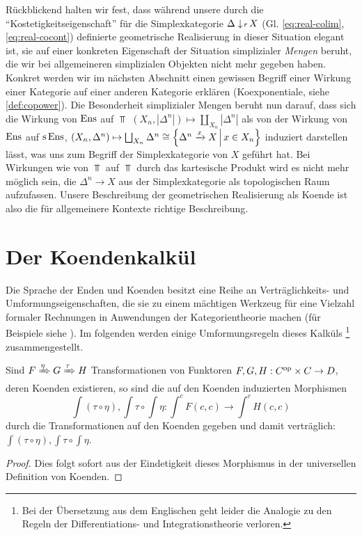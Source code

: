 \begin{bem} \label{coend-correct-real}
  Rückblickend halten wir fest, dass während unsere durch die
  ``Kostetigkeitseigenschaft'' für die Simplexkategorie
  $\Delta \downarrow \! {\scriptstyle r} \, X$ (Gl. \ref{eq:real-colim},
  \ref{eq:real-cocont}) definierte geometrische Realisierung in dieser
  Situation elegant ist, sie auf einer konkreten Eigenschaft der
  Situation simplizialer \emph{Mengen} beruht, die wir bei
  allgemeineren simplizialen Objekten nicht mehr gegeben
  haben. Konkret werden wir im nächsten Abschnitt einen gewissen
  Begriff einer Wirkung einer Kategorie auf einer anderen Kategorie
  erklären (Koexponentiale, siehe \ref{def:copower}). Die Besonderheit
  simplizialer Mengen beruht nun darauf, dass sich die Wirkung von
  $\operatorname{Ens}$ auf $\Top$ $(X_n, |\Delta^n|) \mapsto \coprod_{X_n}
  |\Delta^n|$ als von der Wirkung von $\operatorname{Ens}$ auf $\operatorname{s}\operatorname{Ens}$, $(X_n,
  \Delta^n) \mapsto \bigsqcup_{X_n} \Delta^n \cong \left\{ \Delta^n
    \xrightarrow{x} X \,\middle|\, x \in X_n \right\}$ induziert darstellen lässt, was uns
  zum Begriff der Simplexkategorie von $X$ geführt hat. Bei Wirkungen
  wie von $\Top$ auf $\Top$ durch das kartesische Produkt wird es
  nicht mehr möglich sein, die $\Delta^n \to X$ aus der
  Simplexkategorie als topologischen Raum aufzufassen. Unsere
  Beschreibung der geometrischen Realisierung als Koende ist also die
  für allgemeinere Kontexte richtige Beschreibung.
\end{bem}

\section{Der Koendenkalkül}
\label{sec:coend-calc}

Die Sprache der Enden und Koenden besitzt eine Reihe an
Verträglichkeits- und Umformungseigenschaften, die sie zu einem
mächtigen Werkzeug für eine Vielzahl formaler Rechnungen in
Anwendungen der Kategorientheorie machen (für Beispiele siehe
\cite{Lore}). Im folgenden werden einige Umformungsregeln dieses
Kalküls \footnote{Bei der Übersetzung aus dem Englischen geht leider
  die Analogie zu den Regeln der Differentiations- und
  Integrationstheorie verloren.}  zusammengestellt.

\begin{lemma}
  Sind $F \xRightarrow{\eta} G \xRightarrow{\tau} H$ Transformationen
  von Funktoren $F, G, H: C^\mathrm{op} \times C \to D$, deren Koenden
  existieren, so sind die auf den Koenden induzierten Morphismen
  \[ \int (\tau \circ \eta), \int \tau \circ \int \eta:
  \int^c F(c, c) \to \int^c H(c, c) \]
  durch die Transformationen auf den Koenden gegeben und damit
  verträglich: $\int (\tau \circ \eta), \int \tau \circ \int \eta$.
\end{lemma}
\begin{proof}
  Dies folgt sofort aus der Eindetigkeit dieses Morphismus in der
  universellen Definition von Koenden.
\end{proof}

